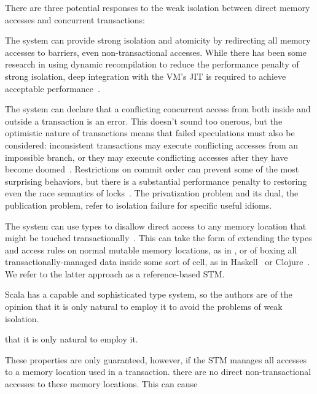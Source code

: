 There are three potential responses to the weak isolation between direct memory
accesses and concurrent transactions:
\begin{packed_itemize}

\item The system can provide strong isolation and atomicity by redirecting
all memory accesses to barriers, even non-transactional accesses.  While
there has been some research in using dynamic recompilation to reduce the
performance penalty of strong isolation, deep integration with the VM's
JIT is required to achieve acceptable performance~\cite{inteldbo,mydbo}.

\item The system can declare that a conflicting concurrent access
from both inside and outside a transaction is an error.  This doesn't
sound too onerous, but the optimistic nature of transactions means
that failed speculations must also be considered: inconsistent
transactions may execute conflicting accesses from an impossible
branch, or they may execute conflicting accesses after they have become
doomed~\cite{grossman?get-cite-from-my-dbo}.  Restrictions on commit
order can prevent some of the most surprising behaviors, but there is
a substantial performance penalty to restoring even the race semantics
of locks~\cite{sgla}.  The privatization problem and its dual, the
publication problem, refer to isolation failure for specific useful
idioms.

\item The system can use types to disallow direct access to any memory
location that might be touched transactionally~\cite{smallstepsemantics}.
This can take the form of extending the types and access rules on
normal mutable memory locations, as in , or
of boxing all transactionally-managed data inside some sort of cell,
as in Haskell~\cite{cmt} or Clojure~\cite{?}.  We refer to the latter
approach as a reference-based STM.

\end{packed_itemize}

Scala has a capable and sophisticated type system, so the authors are of
the opinion that it is only natural to employ it to avoid the problems
of weak isolation.



that it is only natural to employ it.  

These properties are only guaranteed, however, if
the STM manages all accesses to a memory location used in a transaction.
there are no direct non-transactional accesses to these memory locations.
This can cause 

